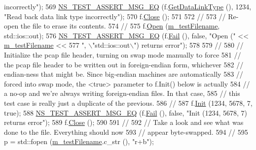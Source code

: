 \begin{DoxyCode}
{       incorrectly"});
569   \hyperlink{group__testing_ga2a9d78cffb3db8e867c35fff0b698cf5}{NS\_TEST\_ASSERT\_MSG\_EQ} (f.\hyperlink{classns3_1_1PcapFile_aa3795e9a87e7a4151fb4d30747eaa072}{GetDataLinkType} (), 1234, \textcolor{stringliteral}{"Read back data
       link type incorrectly"});
570   f.\hyperlink{classns3_1_1PcapFile_ad3b6c28d464742ee1fa3a64628339a5b}{Close} ();
571 
572   \textcolor{comment}{//}
573   \textcolor{comment}{// Re-open the file to erase its contents.}
574   \textcolor{comment}{//}
575   f.\hyperlink{classns3_1_1PcapFile_a064e8494e28e823d0bb4e40549f9f483}{Open} (\hyperlink{classFileHeaderTestCase_a4ab3078ae75680fcc90a3eca9f273cd2}{m\_testFilename}, std::ios::out);
576   \hyperlink{group__testing_ga2a9d78cffb3db8e867c35fff0b698cf5}{NS\_TEST\_ASSERT\_MSG\_EQ} (f.\hyperlink{classns3_1_1PcapFile_a2e00aa080890a0c9c3e9f5bd2d6c21d5}{Fail} (), \textcolor{keyword}{false}, \textcolor{stringliteral}{"Open ("} << 
      \hyperlink{classFileHeaderTestCase_a4ab3078ae75680fcc90a3eca9f273cd2}{m\_testFilename} << 
577                          \textcolor{stringliteral}{", \(\backslash\)"std::ios::out\(\backslash\)") returns error"});
578 
579   \textcolor{comment}{//}
580   \textcolor{comment}{// Initialize the pcap file header, turning on swap mode manually to force}
581   \textcolor{comment}{// the pcap file header to be written out in foreign-endian form, whichever}
582   \textcolor{comment}{// endian-ness that might be.  Since big-endian machines are automatically }
583   \textcolor{comment}{// forced into swap mode, the <true> parameter to f.Init() below is actually}
584   \textcolor{comment}{// a no-op and we're always writing foreign-endian files.  In that case, }
585   \textcolor{comment}{// this test case is really just a duplicate of the previous.}
586   \textcolor{comment}{//}
587   f.\hyperlink{classns3_1_1PcapFile_a80c8adea1baa66e3f730df2927b0fc9b}{Init} (1234, 5678, 7, \textcolor{keyword}{true});
588   \hyperlink{group__testing_ga2a9d78cffb3db8e867c35fff0b698cf5}{NS\_TEST\_ASSERT\_MSG\_EQ} (f.\hyperlink{classns3_1_1PcapFile_a2e00aa080890a0c9c3e9f5bd2d6c21d5}{Fail} (), \textcolor{keyword}{false}, \textcolor{stringliteral}{"Init (1234, 5678, 7) returns error"});
589   f.\hyperlink{classns3_1_1PcapFile_ad3b6c28d464742ee1fa3a64628339a5b}{Close} ();
590 
591   \textcolor{comment}{//}
592   \textcolor{comment}{// Take a look and see what was done to the file.  Everything should now}
593   \textcolor{comment}{// appear byte-swapped.}
594   \textcolor{comment}{//}
595   p = std::fopen (\hyperlink{classFileHeaderTestCase_a4ab3078ae75680fcc90a3eca9f273cd2}{m\_testFilename}.c\_str (), \textcolor{stringliteral}{"r+b"});

\end{DoxyCode}
